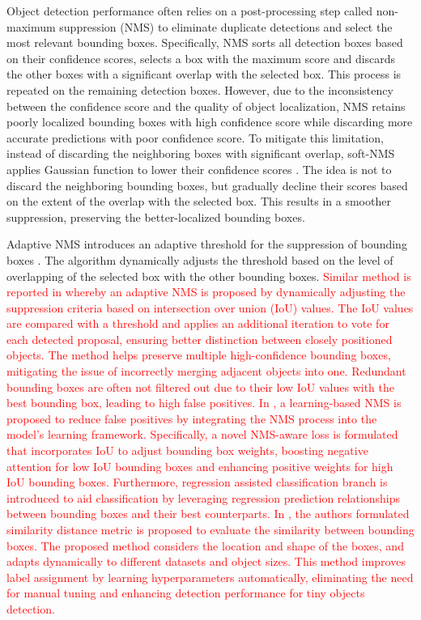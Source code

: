 \documentclass[preprint,12pt]{elsarticle}
\begin{document}
Object detection performance often relies on a post-processing step called non-maximum suppression (NMS) to eliminate duplicate detections and select the most relevant bounding boxes. Specifically, NMS sorts all detection boxes based on their confidence scores, selects a box with the maximum score and discards the other boxes with a significant overlap with the selected box. This process is repeated on the remaining detection boxes. However, due to the inconsistency between the confidence score and the quality of object localization, NMS retains poorly localized bounding boxes with high confidence score while discarding more accurate predictions with poor confidence score. To mitigate this limitation, instead of discarding the neighboring boxes with significant overlap, soft-NMS applies Gaussian function to lower their confidence scores \citep{bodla_soft-nmsimproving_2017}. The idea is not to discard the neighboring bounding boxes, but gradually decline their scores based on the extent of the overlap with the selected box. This results in a smoother suppression, preserving the better-localized bounding boxes. 

Adaptive NMS introduces an adaptive threshold for the suppression of bounding boxes \citep{liu_adaptive_2019}. The algorithm dynamically adjusts the threshold based on the level of overlapping of the selected box with the other bounding boxes. \textcolor{red}{Similar method is reported in \citep{husham_al-badri_adaptive_2023} whereby an adaptive NMS is proposed by dynamically adjusting the suppression criteria based on intersection over union (IoU) values. The IoU values are compared with a threshold and applies an additional iteration to vote for each detected proposal, ensuring better distinction between closely positioned objects. The method helps preserve multiple high-confidence bounding boxes, mitigating the issue of incorrectly merging adjacent objects into one.} \textcolor{red}{Redundant bounding boxes are often not filtered out due to their low IoU values with the best bounding box, leading to high false positives. In \citep{jiang_non-maximum_2024}, a learning-based NMS is proposed to reduce false positives by integrating the NMS process into the model's learning framework. Specifically, a novel NMS-aware loss is formulated that incorporates IoU to adjust bounding box weights, boosting negative attention for low IoU bounding boxes and enhancing positive weights for high IoU bounding boxes. Furthermore, regression assisted classification branch is introduced to aid classification by leveraging regression prediction relationships between bounding boxes and their best counterparts. In \citep{shi_similarity_2024}, the authors formulated similarity distance metric is proposed to evaluate the similarity between bounding boxes. The proposed method considers the location and shape of the boxes, and adapts dynamically to different datasets and object sizes. This method improves label assignment by learning hyperparameters automatically, eliminating the need for manual tuning and enhancing detection performance for tiny objects detection.}
\end{document}
